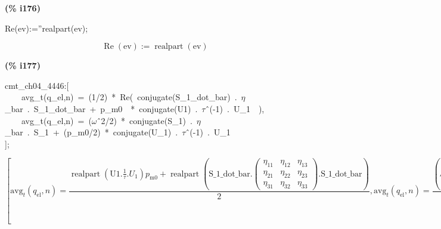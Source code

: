 \documentclass[fleqn]{article}
\begin{document}
\noindent
\begin{minipage}[t]{4.000000em}\color{red}\bfseries
(\% i176)	
\end{minipage}
\begin{minipage}[t]{\textwidth}\color{blue}
Re(ev):=''realpart(ev);
\end{minipage}
\[\displaystyle \tag{\% o176} 
\operatorname{Re}\left( \ensuremath{\mathrm{ev}}\right) \operatorname{:=}\operatorname{realpart}\left( \ensuremath{\mathrm{ev}}\right) \mbox{}
\]


\noindent
\begin{minipage}[t]{4.000000em}\color{red}\bfseries
(\% i177)	
\end{minipage}
\begin{minipage}[t]{\textwidth}\color{blue}
cmt\_ch04\_4446:[\\
\ \ \ \ avg\_t(q\_el,n)\ =\ (1/2)\ *\ Re(\ conjugate(S\_1\_dot\_bar)\ .\ \ensuremath{\eta}\_bar\ .\ S\_1\_dot\_bar\ +\ p\_m0\ \ *\ conjugate(U1)\ .\ \ensuremath{\tau}\^\ (-1)\ .\ U\_1\ \ ),\\
\ \ \ \ avg\_t(q\_el,n)\ =\ (\ensuremath{\omega}\^\ 2/2)\ *\ conjugate(S\_1)\ .\ \ensuremath{\eta}\_bar\ .\ S\_1\ +\ (p\_m0/2)\ *\ conjugate(U\_1)\ .\ \ensuremath{\tau}\^\ (-1)\ .\ U\_1\\
];
\end{minipage}
\[\displaystyle \tag{\% o177} 
\operatorname{[}{{\ensuremath{\mathrm{avg}}}_t}\left( {q_{\ensuremath{\mathrm{el}}}}\operatorname{,}n\right) =\frac{\operatorname{realpart}\left( \ensuremath{\mathrm{U1}}\ensuremath{\mathrm{ . }}\frac{1}{\tau }\ensuremath{\mathrm{ . }}{U_1}\right)  {p_{\ensuremath{\mathrm{m0}}}}+\operatorname{realpart}\left( \ensuremath{\mathrm{S\_ 1\_ dot\_ bar}}\ensuremath{\mathrm{ . }}\begin{pmatrix}{{\eta }_{\ensuremath{\mathrm{11}}}} & {{\eta }_{\ensuremath{\mathrm{12}}}} & {{\eta }_{\ensuremath{\mathrm{13}}}}\\
{{\eta }_{\ensuremath{\mathrm{21}}}} & {{\eta }_{\ensuremath{\mathrm{22}}}} & {{\eta }_{\ensuremath{\mathrm{23}}}}\\
{{\eta }_{\ensuremath{\mathrm{31}}}} & {{\eta }_{\ensuremath{\mathrm{32}}}} & {{\eta }_{\ensuremath{\mathrm{33}}}}\end{pmatrix}\ensuremath{\mathrm{ . }}\ensuremath{\mathrm{S\_ 1\_ dot\_ bar}}\right) }{2}\operatorname{,}{{\ensuremath{\mathrm{avg}}}_t}\left( {q_{\ensuremath{\mathrm{el}}}}\operatorname{,}n\right) =
\frac{\left( {S_1}\ensuremath{\mathrm{ . }}\begin{pmatrix}{{\eta }_{\ensuremath{\mathrm{11}}}} & {{\eta }_{\ensuremath{\mathrm{12}}}} & {{\eta }_{\ensuremath{\mathrm{13}}}}\\
{{\eta }_{\ensuremath{\mathrm{21}}}} & {{\eta }_{\ensuremath{\mathrm{22}}}} & {{\eta }_{\ensuremath{\mathrm{23}}}}\\
{{\eta }_{\ensuremath{\mathrm{31}}}} & {{\eta }_{\ensuremath{\mathrm{32}}}} & {{\eta }_{\ensuremath{\mathrm{33}}}}\end{pmatrix}\ensuremath{\mathrm{ . }}{S_1}\right)  {{\omega }^{2}}}{2}+\frac{\left( {U_1}\ensuremath{\mathrm{ . }}\frac{1}{\tau }\ensuremath{\mathrm{ . }}{U_1}\right)  {p_{\ensuremath{\mathrm{m0}}}}}{2}\operatorname{]}\mbox{}
\]
\end{document}
